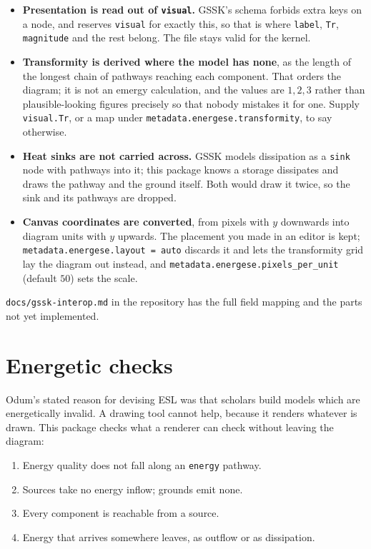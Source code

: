 \documentclass{article}
\begin{document}
\begin{itemize}
\item \textbf{Presentation is read out of \texttt{visual}.} GSSK's schema
forbids extra keys on a node, and reserves \texttt{visual} for exactly this, so
that is where \texttt{label}, \texttt{Tr}, \texttt{magnitude} and the rest
belong. The file stays valid for the kernel.
\item \textbf{Transformity is derived where the model has none}, as the length
of the longest chain of pathways reaching each component. That orders the
diagram; it is not an emergy calculation, and the values are $1, 2, 3$ rather
than plausible-looking figures precisely so that nobody mistakes it for one.
Supply \texttt{visual.Tr}, or a map under
\texttt{metadata.energese.transformity}, to say otherwise.
\item \textbf{Heat sinks are not carried across.} GSSK models dissipation as a
\texttt{sink} node with pathways into it; this package knows a storage
dissipates and draws the pathway and the ground itself. Both would draw it
twice, so the sink and its pathways are dropped.
\item \textbf{Canvas coordinates are converted}, from pixels with $y$
downwards into diagram units with $y$ upwards. The placement you made in an
editor is kept; \texttt{metadata.energese.layout = auto} discards it and lets
the transformity grid lay the diagram out instead, and
\texttt{metadata.energese.pixels\_per\_unit} (default $50$) sets the scale.
\end{itemize}

\noindent \texttt{docs/gssk-interop.md} in the repository has the full field
mapping and the parts not yet implemented.

\section{Energetic checks}
\label{sec:checks}

Odum's stated reason for devising ESL was that scholars build models which are
energetically invalid. A drawing tool cannot help, because it renders whatever
is drawn. This package checks what a renderer can check without leaving the
diagram:

\begin{enumerate}
    \item Energy quality does not fall along an \texttt{energy} pathway.
    \item Sources take no energy inflow; grounds emit none.
    \item Every component is reachable from a source.
    \item Energy that arrives somewhere leaves, as outflow or as dissipation.
\end{enumerate}
\end{document}
